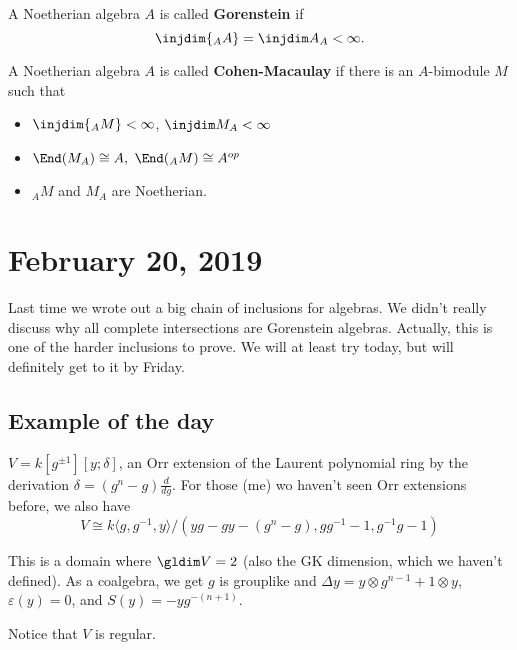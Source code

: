 \documentclass[12pt]{article}
\begin{document}
\begin{defn}
	A Noetherian algebra $A$ is called \textbf{Gorenstein} if 
	\[\injdim{_AA}=\injdim A_A<\infty.\]
\end{defn}
\begin{defn}
	A Noetherian algebra $A$ is called \textbf{Cohen-Macaulay} if there is an $A$-bimodule
	$M$ such that
	\begin{itemize}
		\item $\injdim {_AM}<\infty$, $\injdim M_A<\infty$
		\item $\End(M_A)\cong A,$ $\End({_AM})\cong A^{op}$
		\item ${_AM}$ and $M_A$ are Noetherian.
	\end{itemize}
\end{defn}

\section{February 20, 2019}
Last time we wrote out a big chain of inclusions for algebras. We didn't really discuss why all complete
intersections are Gorenstein algebras. Actually, this is one of the harder inclusions to prove. We will at least 
try today, but will definitely get to it by Friday.

\subsection{Example of the day}
\begin{defn}
	$V=k[g^{\pm 1}][y;\delta]$, an Orr extension of the Laurent polynomial ring by the derivation $\delta=(g^n-g)\frac{d}{dg}$.
	For those (me) wo haven't seen Orr extensions before, we also have
	\[V\cong k\langle g, g^{-1}, y\rangle/(yg-gy-(g^n-g), gg^{-1}-1, g^{-1}g-1)\]

	This is a domain where $\gldim V=2$ (also the GK dimension, which we haven't defined). As a coalgebra, we get
	$g$ is grouplike and $\Delta y= y\otimes g^{n-1}+1\otimes y$, $\varepsilon(y)=0$, and $S(y)=-yg^{-(n+1)}$.

	Notice that $V$ is regular.
\end{defn}
\end{document}
